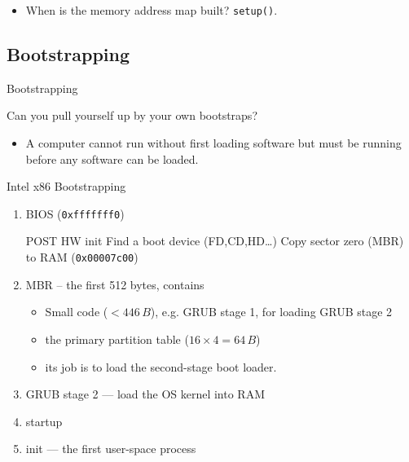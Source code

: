 \begin{itemize}
\item When is the memory address map built? \texttt{setup()}.
\end{itemize}

\subsection{Bootstrapping}
\label{sec:bootstrapping}

\begin{frame}{Bootstrapping}
  \begin{block}{Can you pull yourself up by your own bootstraps?}
    \begin{itemize}
    \item[] A computer cannot run without first loading software but must be running
      before any software can be loaded.
    \end{itemize}
  \end{block}
  \begin{center}
  \end{center}
\end{frame}

\begin{frame}{Intel x86 Bootstrapping}
  \begin{enumerate}
  \item BIOS (\texttt{0xfffffff0})\\
    \begin{small}
      {} POST\quad
      {} HW init\quad
      {} Find a boot device (FD,CD,HD\ldots{})\quad
      {} Copy \alert{sector zero (MBR)} to RAM (\texttt{0x00007c00})
    \end{small}
  \item MBR -- the first 512 bytes, contains
    \begin{itemize}
    \item Small code ($< 446\,B$), e.g. GRUB stage 1, for loading GRUB stage 2
    \item the primary partition table ($16\times{}4=64\,B$)
    \item its job is to load the second-stage boot loader.
    \end{itemize}
  \item GRUB stage 2 --- load the OS kernel into RAM
  \item {\linux} startup
  \item init --- the first user-space process
  \end{enumerate}
  \begin{center}
  \end{center}
  \qquad{}
\end{frame}


